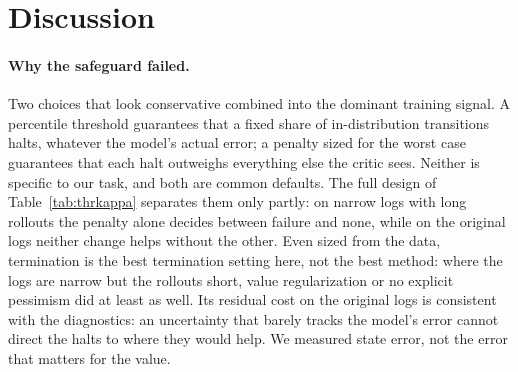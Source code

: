 \documentclass[11pt]{article}
\begin{document}
\begin{table}[h]
\centering\small
{}
\caption{Paired inference at the end point (narrowest logs, 20-step rollouts): HALT $p_{99}$ with the data-sized $\kappa$ against model-based SAC without pessimism and against CQL at $\alpha=0.1$. Discordant: seeds where only the agent without pessimism fails / only the agent with termination fails. McNemar $p$ is exact and two-sided. IQM differences with paired bootstrap intervals; with a failing seed in the sample, the upper end reflects resamples that draw it several times. The held-out row is the confirmatory one; seeds 0--9 were used to choose the end point, so the pooled row is descriptive.}
\label{tab:endpoint}
\end{table}

\section{Discussion}

\paragraph{Why the safeguard failed.} Two choices that look conservative combined into the dominant training signal. A percentile threshold guarantees that a fixed share of in-distribution transitions halts, whatever the model's actual error; a penalty sized for the worst case guarantees that each halt outweighs everything else the critic sees. Neither is specific to our task, and both are common defaults. The full design of Table~\ref{tab:thrkappa} separates them only partly: on narrow logs with long rollouts the penalty alone decides between failure and none, while on the original logs neither change helps without the other. Even sized from the data, termination is the best termination setting here, not the best method: where the logs are narrow but the rollouts short, value regularization or no explicit pessimism did at least as well. Its residual cost on the original logs is consistent with the diagnostics: an uncertainty that barely tracks the model's error cannot direct the halts to where they would help. We measured state error, not the error that matters for the value.
\end{document}
